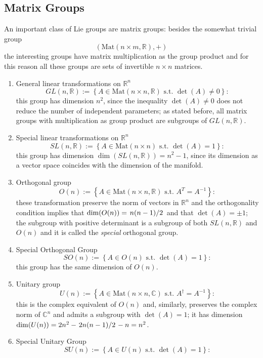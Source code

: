 \subsection{Matrix Groups}
An important class of Lie groups are matrix groups: besides the somewhat trivial
group
$$\left(\text{Mat}(n\times m,\mathbb{R}),+\right)$$
the interesting groups have matrix multiplication as the group product and for this
reason all these groups are sets of invertible $n\times n$ matrices.
\begin{enumerate}
    \item General linear transformations on $\mathbb{R}^n$
        $$GL(n,\mathbb{R}):=\left\{A\in\text{Mat}(n\times n,\mathbb{R})\text{ s.t. }
        \det(A)\neq 0\right\}:$$
        this group has dimension $n^2$, since the inequality $\det(A)\neq 0$ does not
        reduce the number of independent parameters; as stated before, all matrix
        groups with multiplication as group product are
        subgroups of $GL(n,\mathbb{R})$.
    \item Special linear transformations on $\mathbb{R}^n$
        $$SL(n,\mathbb{R}):=\left\{A\in\text{Mat}(n\times n)\text{ s.t. }\det(A)=1
        \right\}:$$
        this group has dimension $\dim(SL(n,\mathbb{R})) = n^2-1$, since its
        dimension as a vector space coincides with the dimension of the manifold.
    \item Orthogonal group
        $$O(n):=\left\{A\in\text{Mat}(n\times n,\mathbb{R})\text{ s.t. }A^T=A^{-1}
        \right\}:$$
        these transformation preserve the norm of vectors in $\mathbb{R}^n$ and 
        the orthogonality condition implies that $\dim(O(n)) = \flatfrac{n(n-1)}{2}$
        and that $\det(A)=\pm1$; the subgroup with positive determinant is
        a subgroup of both $SL(n,\mathbb{R})$ and $O(n)$ and it is called the
        \textit{special} orthogonal group.
    \item Special Orthogonal Group
        $$SO(n) :=\left\{A\in O(n)\text{ s.t. } \det(A)=1\right\}:$$
        this group has the same dimension of $O(n)$.
    \item Unitary group
        $$U(n):=\left\{A\in\text{Mat}(n\times n,\mathbb{C})\text{ s.t. }A^\dagger=
        A^{-1}\right\}:$$
        this is the complex equivalent of $O(n)$ and, similarly, preserves the
        complex norm of $\mathbb{C}^n$ and admits a subgroup with $\det(A)=1$; it has
        dimension $\dim(U(n))=2n^2-\flatfrac{2n(n-1)}{2} - n =n^2$.
    \item Special Unitary Group
        $$SU(n) :=\left\{A\in U(n)\text{ s.t. } \det(A)=1\right\}:$$

\end{enumerate}
